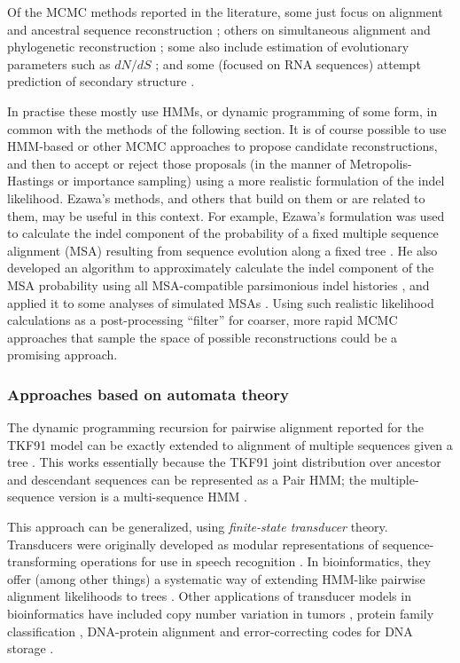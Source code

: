 \documentclass{bmcart}
\begin{document}
Of the MCMC methods reported in the literature,
some just focus on alignment and ancestral sequence reconstruction \cite{HolmesBruno2001};
others on simultaneous alignment and phylogenetic reconstruction
\cite{RedelingsSuchard2005,SuchardRedelings2006,RedelingsSuchard2007,NovakEtAl2008,BouchardCoteEtAl2009,WestessonBarquistHolmes2012};
some also include estimation of evolutionary parameters such as $dN/dS$ \cite{Redelings2014};
and some (focused on RNA sequences) attempt prediction of secondary structure \cite{ArunapuramEtAl2013,MeyerMiklos2007}.

In practise these mostly use HMMs, or dynamic programming of some form,
in common with the methods of the following section.
\color{red}
It is of course possible to use HMM-based or other MCMC approaches to propose candidate
reconstructions, and then to accept or reject those proposals
(in the manner of Metropolis-Hastings or importance sampling)
using a more realistic formulation of the indel likelihood.
Ezawa's methods, and others that build on them or are related to them, may be useful in this context.
For example, Ezawa's formulation was used to calculate the indel component of the probability of a fixed multiple sequence alignment (MSA)
resulting from sequence evolution along a fixed tree \cite{Ezawa2016b}.
He also developed an
algorithm to approximately calculate the indel component of the MSA probability
using all MSA-compatible parsimonious indel histories \cite{Ezawa2016a},
and applied it to some analyses of simulated MSAs \cite{Ezawa2016c}.
Using such realistic likelihood calculations as a post-processing ``filter''
for coarser, more rapid MCMC approaches
that sample the space of possible reconstructions could be a promising approach.
\color{black}

\subsubsection*{Approaches based on automata theory}

The dynamic programming recursion for pairwise alignment reported for the TKF91 model \cite{ThorneEtal91}
can be exactly extended to alignment of multiple sequences given a tree \cite{Hein2001,LunterSongMiklosHein2003}.
This works essentially because the TKF91 joint distribution over ancestor and descendant sequences
can be represented as a Pair HMM;
the multiple-sequence version is a multi-sequence HMM \cite{HolmesBruno2001}.

This approach can be generalized, using {\em finite-state transducer} theory.
Transducers were originally developed as modular representations of sequence-transforming operations
for use in speech recognition \cite{MohriPereiraRiley2000}.
In bioinformatics, they offer (among other things)
a systematic way of extending HMM-like pairwise alignment likelihoods to trees
\cite{pmid7584457,WestessonEtAl2012,BouchardCote2013,IndelHistorian}.
Other applications of transducer models in bioinformatics have included
copy number variation in tumors \cite{pmid24743184},
protein family classification \cite{pmid12804091},
DNA-protein alignment \cite{pmid15123596}
and error-correcting codes for DNA storage \cite{DBLP:journals/corr/Holmes16}.
\end{document}
